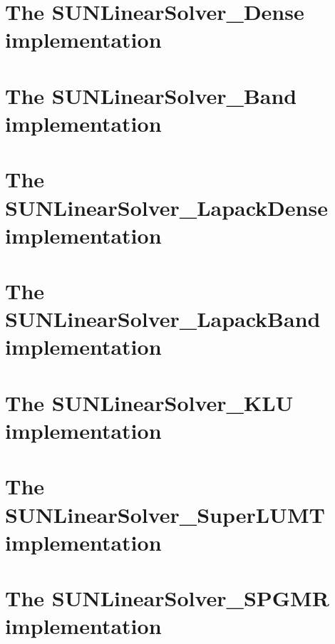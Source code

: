 \bigskip



\section{The SUNLinearSolver\_Dense implementation}\label{ss:sunlinsol_dense}


\section{The SUNLinearSolver\_Band implementation}\label{ss:sunlinsol_band}


\section{The SUNLinearSolver\_LapackDense implementation}\label{ss:sunlinsol_lapdense}


\section{The SUNLinearSolver\_LapackBand implementation}\label{ss:sunlinsol_lapband}


\section{The SUNLinearSolver\_KLU implementation}\label{ss:sunlinsol_klu}


\section{The SUNLinearSolver\_SuperLUMT implementation}\label{ss:sunlinsol_superlumt}


\section{The SUNLinearSolver\_SPGMR implementation}\label{ss:sunlinsol_spgmr}


